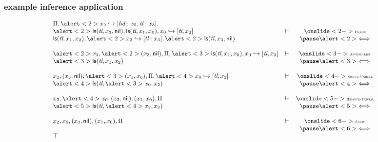 \begin{frame}
\frametitle{example inference application}
\[\small\begin{array}{llc}
\Pi,\alert<2>{\sfpointsto {x_2} {\textit{hd}:x_5, \textit{tl}:x_3}},\\
\alert<2>{\sflist(\textit{tl},x_3,\nil)}, \sflist(\textit{tl},x_1,x_0),
\sfpointsto {x_0} {\textit{tl},x_2} & \vdash & \onslide<2->{\textsc{\tiny Frame}} \\
\sflist(\textit{tl},x_1,x_2), \alert<2>{\sfpointsto {x_2} {\textit{tl}:x_3}},
\alert<2>{\sflist(\textit{tl},x_3,\nil)} & & \pause \alert<2>{\Longleftrightarrow} \\
\\

\alert<2>{x_2},\alert<2>{(x_3,\nil)},\Pi, \alert<3>{\sflist(\textit{tl},x_1,x_0)},
\sfpointsto {x_0} {\textit{tl},x_2} & \vdash & \onslide<3->{\text{\textsc{\tiny Append-List}}} \\
\alert<3>{\sflist(\textit{tl},x_1,x_2)} & & \pause \alert<3>{\Longleftrightarrow} \\
\\


x_2,(x_3,\nil),\alert<3>{(x_1,x_0)},\Pi,
\alert<4>{\sfpointsto {x_0} {\textit{tl},x_2}} & \vdash & \onslide<4->{\textsc{\tiny Simple-Unroll}} \\
\alert<4>{\sflist(\textit{tl},\alert<3>{x_0},x_2)} & & \pause \alert<4>{\Longleftrightarrow} \\
\\


x_2,\alert<4>{x_0},(x_3,\nil),(x_1,x_0),\Pi & \vdash & \onslide<5->{\textsc{\tiny Remove-Trivial}} \\
\alert<5>{\sflist(\textit{tl},\alert<4>{x_2},x_2)} & & \pause\alert<5>{\Longleftrightarrow} \\
\\


x_2,x_0,(x_3,\nil),(x_1,x_0),\Pi & \vdash & \onslide<6->{\textsc{\tiny Axiom}} \\
 & & \pause \alert<6>{\Longleftrightarrow} \\

\top
\end{array}
\]
\end{frame}

